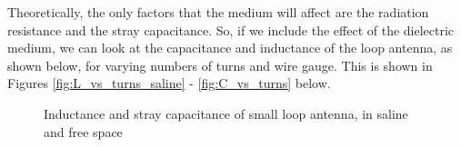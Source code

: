 \documentclass[12pt,onecolumn,titlepage]{article}
\begin{document}
Theoretically, the only factors that the medium will affect are the radiation resistance and the stray capacitance. So, if we include the effect of the dielectric medium, we can look at the capacitance and inductance of the loop antenna, as shown below, for varying numbers of turns and wire gauge. This is shown in Figures \ref{fig:L_vs_turns_saline} - \ref{fig:C_vs_turns} below.



\begin{figure}[htbp]
	\centering
		\quad
		\quad
	\label{fig:loop_C_and_L}
	\caption{Inductance and stray capacitance of small loop antenna, in saline and free space}
\end{figure}
\end{document}
